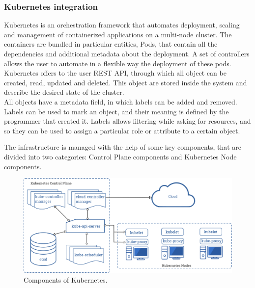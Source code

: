 \subsubsection*{Kubernetes integration}
Kubernetes is an orchestration framework that automates deployment, scaling and management of containerized
applications on a multi-node cluster.
The containers are bundled in particular entities, Pods, that contain all the dependencies and 
additional metadata about the deployment. A set of controllers allows the user to automate
in a flexible way the deployment of these pods.
\\
Kubernetes offers to the user REST API, through which all object can be created, read, updated
and deleted. This object are stored inside the system and describe the desired state of the cluster.
\\
All objects have a metadata field, in which labels can be added and removed.
Labels can be used to mark an object, and their meaning is defined by the programmer that created it.
Labels allows filtering while asking for resources, and so they can be used to assign a particular role 
or attribute to a certain object.
\par
The infrastructure is managed with the help of some key components, that are divided into two categories:
Control Plane components and Kubernetes Node components.
\begin{figure}
    \includegraphics[width=\linewidth]{Images/components-of-kubernetes.png}
    \caption{Components of Kubernetes.}
    \label{fig:boat1}
  \end{figure}



